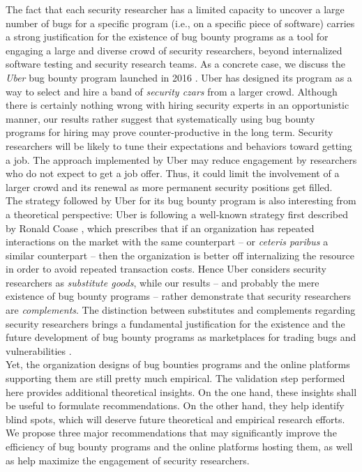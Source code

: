 The fact that each security researcher has a limited capacity to uncover a large number of bugs for a specific program (i.e., on a specific piece of software) carries a strong justification for the existence of bug bounty programs as a tool for engaging a large and diverse crowd of security researchers, beyond internalized software testing and security research teams. As a concrete case, we discuss the {\it Uber} bug bounty program launched in 2016 \cite{moussouris2016}. Uber has designed its program as a way to select and hire a band of {\it security czars} from a larger crowd. Although there is certainly nothing wrong with hiring security experts in an opportunistic manner, our results rather suggest that systematically using bug bounty programs for hiring may prove counter-productive in the long term. Security researchers will be likely to tune their expectations and behaviors toward getting a job. The approach implemented by Uber may reduce engagement by researchers who do not expect to get a job offer. Thus, it could limit the involvement of a larger crowd and its renewal as more permanent security positions get filled. \\

The strategy followed by Uber for its bug bounty program is also interesting from a theoretical perspective: Uber is following a well-known strategy first described by Ronald Coase \cite{coase1937}, which prescribes that if an organization has repeated interactions on the market with the same counterpart -- or {\it ceteris paribus} a similar counterpart -- then the organization is better off internalizing the resource in order to avoid repeated transaction costs. Hence Uber considers security researchers as {\it substitute goods}, while our results -- and probably the mere existence of bug bounty programs -- rather demonstrate that security researchers are {\it complements}. The distinction between substitutes and complements regarding security researchers brings a fundamental justification for the existence and the future development of bug bounty programs as marketplaces for trading bugs and vulnerabilities \cite{bohme2006comparison}. \\

Yet, the organization designs of bug bounties programs and the online platforms supporting them are still pretty much empirical. The validation step performed here provides additional theoretical insights. On the one hand, these insights shall be useful to formulate recommendations. On the other hand, they help identify blind spots, which will deserve future theoretical and empirical research efforts. We propose three major recommendations that may significantly improve the efficiency of bug bounty programs and the online platforms hosting them, as well as help maximize the engagement of security researchers. 

